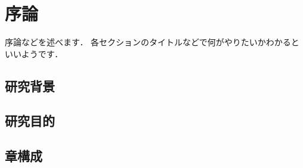 

\chapter{序論}

序論などを述べます．
各セクションのタイトルなどで何がやりたいかわかるといいようです．

\section{研究背景}

\section{研究目的}

\section{章構成}
